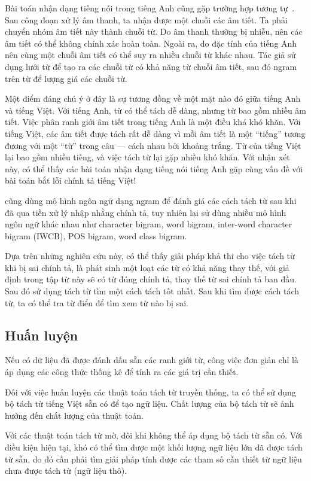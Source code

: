 \documentclass[a4paper,oneside,14pt]{extbook} %
\begin{document}
Bài toán nhận dạng tiếng nói trong tiếng Anh cũng gặp trường hợp tương
tự~\cite{Ravishankar}. Sau công đoạn xử lý âm thanh, ta nhận được 
một chuỗi các âm tiết. Ta phải chuyển nhóm âm tiết này thành
chuỗi từ. Do âm thanh thường bị nhiễu, nên các âm tiết có thể
không chính xác hoàn toàn. Ngoài ra, do đặc tính của tiếng Anh nên
cùng một chuỗi âm tiết có thể suy ra nhiều chuỗi từ khác nhau. Tác giả
sử dụng lưới từ để tạo ra các chuỗi từ có khả năng từ chuỗi âm tiết,
sau đó n\-gram trên từ để lượng giá các chuỗi từ.

Một điểm đáng chú ý ở
đây là sự tương đồng về một mặt nào đó giữa tiếng Anh và tiếng
Việt. Với tiếng Anh, từ có thể tách dễ dàng, nhưng từ bao gồm nhiều âm
tiết. Việc phân ranh giới âm tiết trong tiếng Anh là một điều khá khó
khăn. Với tiếng Việt, các âm tiết được tách rất dễ dàng vì mỗi âm tiết
là một ``tiếng'' tương đương với một ``từ'' trong câu --- cách nhau
bởi khoảng trắng. Từ của tiếng Việt lại bao gồm nhiều tiếng, và việc
tách từ lại gặp nhiều khó khăn. Với nhận xét này, có thể thấy các bài
toán nhận dạng tiếng nói tiếng Anh gặp cùng vấn đề với bài toán bắt
lỗi chính tả tiếng Việt!

\cite{Chang} cũng dùng mô hình ngôn ngữ dạng n\-gram để đánh giá các
cách tách từ sau khi đã qua tiền xử lý nhập nhằng chính tả, tuy nhiên
lại sử dùng nhiều mô hình ngôn ngữ khác nhau như 
character bi\-gram, word bi\-gram, inter-word character bi\-gram (IWCB), POS
bi\-gram, word class bi\-gram.

Dựa trên những nghiên cứu này, có thể thấy giải pháp khả thi cho việc
tách từ khi bị 
sai chính tả, là phát sinh một loạt các từ có khả năng thay thế, với
giả định trong tập từ này sẽ có từ đúng chính tả, thay thế từ sai chính
tả ban đầu. Sau đó sử dụng tách từ tìm một cách tách tốt nhất. Sau khi
tìm được cách tách từ, ta có thể tra từ điển để tìm xem từ nào bị sai.

\subsection{Huấn luyện}

Nếu có dữ liệu đã được đánh dấu sẵn các ranh giới từ, công việc đơn
giản chỉ là áp dụng các công thức thống kê để tính ra các giá trị cần
thiết.

Đối với việc huấn luyện các thuật toán tách từ truyền thống, ta có thể
sử dụng bộ tách từ tiếng Việt sẵn có để tạo ngữ liệu. Chất lượng của
bộ tách từ sẽ ảnh hưởng đến chất lượng của thuật toán.

Với các thuật toán tách từ mờ, đôi khi không thể áp dụng bộ tách từ
sẵn có. Với điều kiện hiện tại, khó có thể tìm được một khối lượng
ngữ liệu lớn đã được tách từ sẵn, do đó cần phải tìm giải pháp tính
được các tham số cần thiết từ ngữ liệu chưa được tách từ (ngữ liệu thô).
\end{document}
